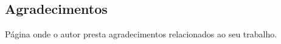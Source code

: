 \newpage %
\thispagestyle{empty} %
\clearpage %

\begin{center}
    \section*{Agradecimentos} %
\end{center}

Página onde o autor presta agradecimentos relacionados ao seu trabalho.

\thispagestyle{empty} %
\clearpage %
